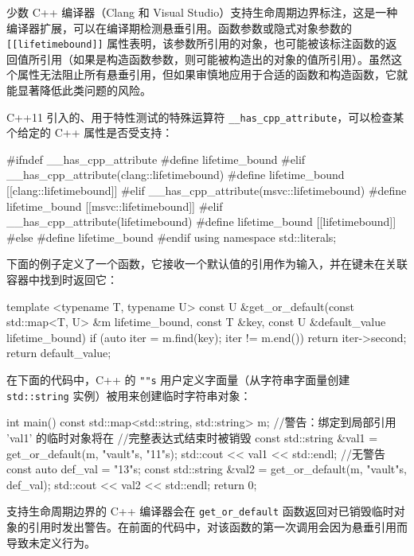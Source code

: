 少数 C++ 编译器（Clang 和 Visual Studio）支持生命周期边界标注，这是一种编译器扩展，可以在编译期检测悬垂引用。函数参数或隐式对象参数的 \texttt{[[lifetimebound]]} 属性表明，该参数所引用的对象，也可能被该标注函数的返回值所引用（如果是构造函数参数，则可能被构造出的对象的值所引用）。虽然这个属性无法阻止所有悬垂引用，但如果审慎地应用于合适的函数和构造函数，它就能显著降低此类问题的风险。

C++11 引入的、用于特性测试的特殊运算符 \texttt{\_\allowbreak{}\_\allowbreak{}has\_\allowbreak{}cpp\_\allowbreak{}attribute}，可以检查某个给定的 C++ 属性是否受支持：

\begin{codebox}[cpp]
#ifndef __has_cpp_attribute
#define lifetime_bound
#elif __has_cpp_attribute(clang::lifetimebound)
#define lifetime_bound [[clang::lifetimebound]]
#elif __has_cpp_attribute(msvc::lifetimebound)
#define lifetime_bound [[msvc::lifetimebound]]
#elif __has_cpp_attribute(lifetimebound)
#define lifetime_bound [[lifetimebound]]
#else
#define lifetime_bound
#endif
using namespace std::literals;
\end{codebox}

下面的例子定义了一个函数，它接收一个默认值的引用作为输入，并在键未在关联容器中找到时返回它：

\begin{codebox}[cpp]
template <typename T, typename U>
const U &get_or_default(const std::map<T, U> &m lifetime_bound, const T &key,
                        const U &default_value lifetime_bound) {
  if (auto iter = m.find(key); iter != m.end())
    return iter->second;
  return default_value;
}
\end{codebox}

\label{idx:1091}
在下面的代码中，C++ 的 \texttt{""s} 用户定义字面量（从字符串字面量创建 \texttt{std::\allowbreak{}string} 实例）被用来创建临时字符串对象：

\begin{codebox}[cpp]
int main() {
  const std::map<std::string, std::string> m;
  //警告：绑定到局部引用 'val1' 的临时对象将在
  //完整表达式结束时被销毁
  const std::string &val1 = get_or_default(m, "vault"s, "11"s);
  std::cout << val1 << std::endl;
  //无警告
  const auto def_val = "13"s;
  const std::string &val2 = get_or_default(m, "vault"s, def_val);
  std::cout << val2 << std::endl;
  return 0;
}
\end{codebox}

\label{idx:1092}
支持生命周期边界的 C++ 编译器会在 \texttt{get\_\allowbreak{}or\_\allowbreak{}default} 函数返回对已销毁临时对象的引用时发出警告。在前面的代码中，对该函数的第一次调用会因为悬垂引用而导致未定义行为。

